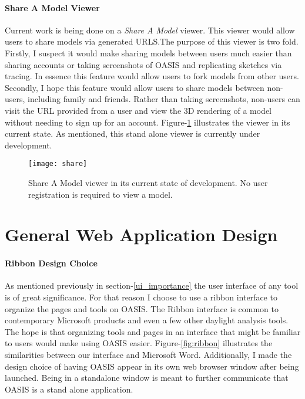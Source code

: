 \paragraph{Share A Model Viewer}
Current work is being done on a \textit{Share A Model} viewer. This viewer would allow users to share models via generated URLS.The purpose of this viewer is two fold. Firstly, I suspect it would make sharing models between users much easier than sharing accounts or taking screenshots of OASIS and replicating sketches via tracing. In essence this feature would allow users to fork models from other users. Secondly, I hope this feature would allow users to share models between non-users, including family and friends. Rather than taking screenshots, non-users can visit the URL provided from a user and view the 3D rendering of a model without needing to sign up for an account. Figure-\ref{fig:share} illustrates the viewer in its current state. As mentioned, this stand alone viewer is currently under development.
\begin{figure}[!ht]
\centering
\caption[Share A Model viewer in its current state of development.]{Share A Model viewer in its current state of development. No user registration is required to view a model.}
\label{fig:share}
\texttt{[image: share]}
\end{figure}

\section{General Web Application Design}

\paragraph{Ribbon Design Choice} As mentioned previously in section-\ref{ui_importance} the user interface of any tool is of great significance. 
For that reason I choose to use a ribbon interface to organize the pages and tools on OASIS. 
The Ribbon interface is common to contemporary Microsoft products and even a few other daylight analysis tools\cite{Dostal}.
The hope is that organizing tools and pages in an interface that might be familiar to users would make using OASIS easier. Figure-\ref{fig:ribbon} illustrates the similarities between our interface and Microsoft Word.
Additionally, I made the design choice of having OASIS appear in its own web browser window after being launched. Being in a standalone window is meant to further communicate that OASIS is a stand alone application.


